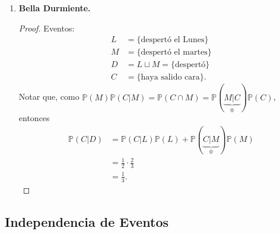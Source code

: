 \documentclass[a4paper]{report}
\begin{document}
\begin{enumerate}
	\item \textbf{Bella Durmiente.}
	\begin{proof}
		Eventos:
		\begin{align*}
			L & = \{\text{despertó el Lunes}\} \\
			M & = \{\text{despertó el martes}\} \\
			D & = L \sqcup M = \{\text{despertó}\} \\
			C & = \{\text{haya salido cara}\}  
		.\end{align*}
		Notar que, como $\mathbb{P}(M)\mathbb{P}(C|M) = \mathbb{P}(C\cap M) = \mathbb{P}(\underbrace{M|C}_{0})\mathbb{P}(C)$, entonces
		\begin{align*}
			\mathbb{P}(C|D) & = \mathbb{P}(C|L)\mathbb{P}(L) + \mathbb{P}(\underbrace{C|M}_{0})\mathbb{P}(M) \\
			& = \frac{1}{2} \cdot \frac{2}{3} \\
			& = \frac{1}{3}
		.\end{align*}
	\end{proof}
\end{enumerate}

\subsection{Independencia de Eventos}
\end{document}
